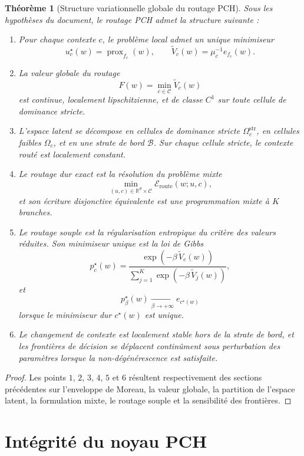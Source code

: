 \documentclass[11pt,a4paper]{article}
\newtheorem{theorem}{Théorème}[section]
\DeclareMathOperator{\prox}{prox}
\newcommand{\R}{\mathbb R}
\newcommand{\Ccal}{\mathcal C}
\begin{document}
\begin{theorem}[Structure variationnelle globale du routage PCH]
Sous les hypothèses du document, le routage PCH admet la structure suivante :
\begin{enumerate}[leftmargin=2em]
\item Pour chaque contexte \(c\), le problème local admet un unique minimiseur
\[
u_c^\star(w)=\prox_{f_c}(w),
\qquad
\widetilde V_c(w)=\mu_c^{-1}e_{f_c}(w).
\]
\item La valeur globale du routage
\[
F(w)=\min_{c\in\Ccal}\widetilde V_c(w)
\]
est continue, localement lipschitzienne, et de classe \(C^1\) sur toute cellule de dominance stricte.
\item L'espace latent se décompose en cellules de dominance stricte \(\Omega_c^{\mathrm{str}}\), en cellules faibles \(\Omega_c\), et en une strate de bord \(\mathcal B\). Sur chaque cellule stricte, le contexte routé est localement constant.
\item Le routage dur exact est la résolution du problème mixte
\[
\min_{(u,c)\in\R^d\times\Ccal}\mathcal E_{\mathrm{route}}(w;u,c),
\]
et son écriture disjonctive équivalente est une programmation mixte à \(K\) branches.
\item Le routage souple est la régularisation entropique du critère des valeurs réduites. Son minimiseur unique est la loi de Gibbs
\[
p_c^\star(w)
=
\frac{\exp(-\beta\,\widetilde V_c(w))}
{\sum_{j=1}^K \exp(-\beta\,\widetilde V_j(w))},
\]
et
\[
p^\star_\beta(w)\xrightarrow[\beta\to+\infty]{}e_{c^\star(w)}
\]
lorsque le minimiseur dur \(c^\star(w)\) est unique.
\item Le changement de contexte est localement stable hors de la strate de bord, et les frontières de décision se déplacent continûment sous perturbation des paramètres lorsque la non-dégénérescence est satisfaite.
\end{enumerate}
\end{theorem}

\begin{proof}
Les points \(1\), \(2\), \(3\), \(4\), \(5\) et \(6\) résultent respectivement des sections précédentes sur l'enveloppe de Moreau, la valeur globale, la partition de l'espace latent, la formulation mixte, le routage souple et la sensibilité des frontières.
\end{proof}

\section{Intégrité du noyau PCH}
\end{document}
